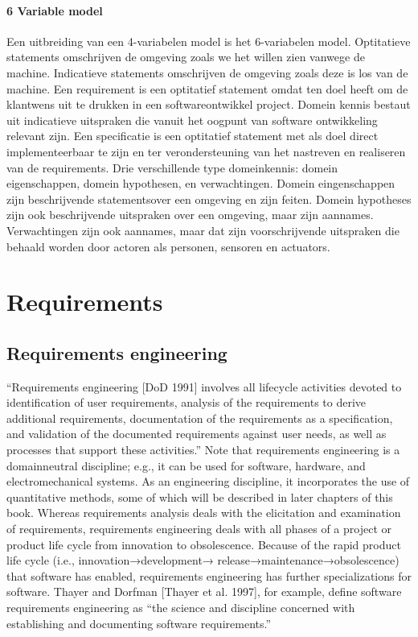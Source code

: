 \documentclass{article}
\begin{document}
	\paragraph{6 Variable model}
	Een uitbreiding van een 4-variabelen model is het 6-variabelen model.
	Optitatieve statements omschrijven de omgeving zoals we het willen zien vanwege de machine. 
	Indicatieve statements omschrijven de omgeving zoals deze is los van de machine. 
	Een requirement is een optitatief statement omdat ten doel heeft om de klantwens uit te drukken in een softwareontwikkel project. 
	Domein kennis bestaut uit indicatieve uitspraken die vanuit het oogpunt van software ontwikkeling relevant zijn. 
	Een specificatie is een optitatief statement met als doel direct implementeerbaar te zijn en ter verondersteuning van het nastreven en realiseren van de requirements. 
	Drie verschillende type domeinkennis: domein eigenschappen, domein hypothesen, en verwachtingen. 
	Domein eingenschappen  zijn beschrijvende statementsover een omgeving en zijn feiten. Domein hypotheses  zijn ook beschrijvende uitspraken over een omgeving, maar zijn aannames. 
	Verwachtingen zijn ook aannames, maar dat zijn voorschrijvende uitspraken die behaald worden door actoren als personen, sensoren en actuators. 
	
	
	
	\section{Requirements}
	
	\subsection{Requirements engineering}
	“Requirements engineering [DoD 1991] involves all lifecycle activities
	devoted to identification of user requirements, analysis of the
	requirements to derive additional requirements, documentation of
	the requirements as a specification, and validation of the documented
	requirements against user needs, as well as processes that support
	these activities.” Note that requirements engineering is a domainneutral
	discipline; e.g., it can be used for software, hardware, and
	electromechanical systems. As an engineering discipline, it
	incorporates the use of quantitative methods, some of which will be
	described in later chapters of this book.
	Whereas requirements analysis deals with the elicitation and
	examination of requirements, requirements engineering deals with all
	phases of a project or product life cycle from innovation to obsolescence.
	Because of the rapid product life cycle (i.e., innovation→development→
	release→maintenance→obsolescence) that software has enabled,
	requirements engineering has further specializations for software.
	Thayer and Dorfman [Thayer et al. 1997], for example, define software
	requirements engineering as “the science and discipline concerned
	with establishing and documenting software requirements.”
	
\end{document}
